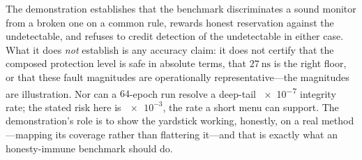 The demonstration establishes that the benchmark discriminates a sound monitor from
a broken one on a common rule, rewards honest reservation against the undetectable,
and refuses to credit detection of the undetectable in either case. What it does
\emph{not} establish is any accuracy claim: it does not certify that the composed
protection level is safe in absolute terms, that $\SI{27}{\nano\second}$ is the
right floor, or that these fault magnitudes are operationally representative---the
magnitudes are \Modelled{} illustration. Nor can a $64$-epoch run resolve a
deep-tail \num{e-7} integrity rate; the stated risk here is $\num{e-3}$, the rate a
short menu can support. The demonstration's role is to show the yardstick working,
honestly, on a real method---mapping its coverage rather than flattering it---and
that is exactly what an honesty-immune benchmark should do.
